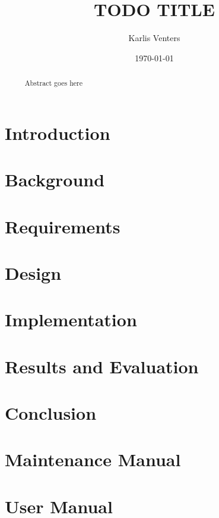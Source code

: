 \documentclass{csfourzero}
\title{TODO TITLE}
\author{Karlis Venters}
\date{\today}
\begin{document}
\maketitle
% 

\begin{abstract}~
Abstract goes here
\end{abstract}

\newpage
\tableofcontents{}

\newpage
\listoffigures

\newpage
\section{Introduction}
\label{sec:intro}



\newpage
\section{Background}
\label{sec:literature}




\newpage
\section{Requirements}
\label{sec:requirements}


\newpage
\section{Design}
\label{sec:design}



\newpage
\section{Implementation}
\label{sec:implementation}



\newpage
\section{Results and Evaluation}
\label{sec:evaluation}


\newpage
\section{Conclusion}
\label{sec:conclusion}


\newpage
\printbibliography

\newpage
\appendix
\section{Maintenance Manual}


\newpage
\section{User Manual}

\end{document}
